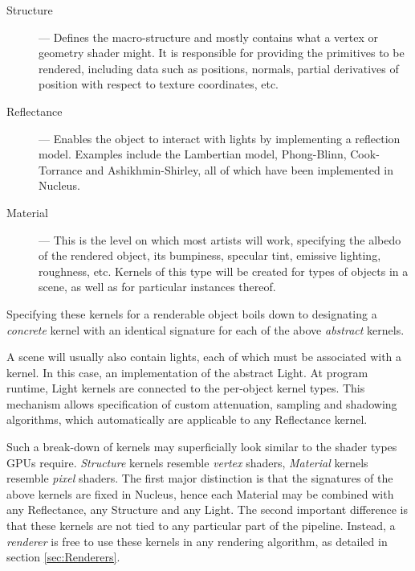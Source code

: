 \begin{description}

\item[Structure] --- Defines the macro-structure and mostly contains what a vertex or geometry shader might. It is responsible for providing the primitives to be rendered, including data such as positions, normals, partial derivatives of position with respect to texture coordinates, etc.

\item[Reflectance] --- Enables the object to interact with lights by implementing a reflection model. Examples include the Lambertian model, Phong-Blinn, Cook-Torrance and Ashikhmin-Shirley, all of which have been implemented in Nucleus.

\item[Material] --- This is the level on which most artists will work, specifying the albedo of the rendered object, its bumpiness, specular tint, emissive lighting, roughness, etc. Kernels of this type will be created for types of objects in a scene, as well as for particular instances thereof.

\end{description}

Specifying these kernels for a renderable object boils down to designating a \emph{concrete} kernel with an identical signature for each of the above \emph{abstract} kernels.

A scene will usually also contain lights, each of which must be associated with a kernel. In this case, an implementation of the abstract Light. At program runtime, Light kernels are connected to the per-object kernel types. This mechanism allows specification of custom attenuation, sampling and shadowing algorithms, which automatically are applicable to any Reflectance kernel.


Such a break-down of kernels may superficially look similar to the shader types GPUs require. \emph{Structure} kernels resemble \emph{vertex} shaders, \emph{Material} kernels resemble \emph{pixel} shaders. The first major distinction is that the signatures of the above kernels are fixed in Nucleus, hence each Material may be combined with any Reflectance, any Structure and any Light. The second important difference is that these kernels are not tied to any particular part of the pipeline. Instead, a \emph{renderer} is free to use these kernels in any rendering algorithm, as detailed in section \ref{sec:Renderers}.

